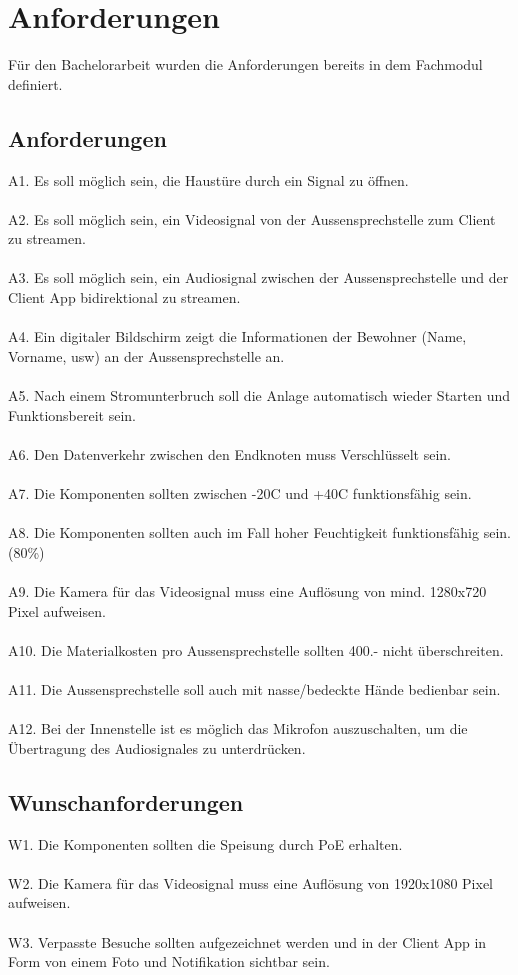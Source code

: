 \section{Anforderungen}
Für den Bachelorarbeit wurden die Anforderungen bereits in dem Fachmodul definiert.
\subsection{Anforderungen}
\label{sec:anforderungen}
A1. Es soll möglich sein, die Haustüre durch ein Signal zu öffnen. 
\\
\\
A2. Es soll möglich sein, ein Videosignal von der Aussensprechstelle zum Client zu streamen. 
\\
\\
A3. Es soll möglich sein, ein Audiosignal zwischen der Aussensprechstelle und der Client App bidirektional zu streamen. 
\\
\\
A4. Ein digitaler Bildschirm zeigt die Informationen der Bewohner (Name, Vorname, usw) an der Aussensprechstelle an. 
\\
\\
A5. Nach einem Stromunterbruch soll die Anlage automatisch wieder Starten und Funktionsbereit sein. 
\\
\\
A6. Den Datenverkehr zwischen den Endknoten muss Verschlüsselt sein. 
\\
\\
A7. Die Komponenten sollten zwischen -20C und +40C funktionsfähig sein. 
\\
\\
A8. Die Komponenten sollten auch im Fall hoher Feuchtigkeit funktionsfähig sein. (80\%) 
\\
\\
A9. Die Kamera für das Videosignal muss eine Auflösung von mind. 1280x720 Pixel aufweisen.  
\\
\\
A10. Die Materialkosten pro Aussensprechstelle sollten 400.- nicht überschreiten. 
\\
\\
A11. Die Aussensprechstelle soll auch mit nasse/bedeckte Hände bedienbar sein. 
\\
\\
A12. Bei der Innenstelle ist es möglich das Mikrofon auszuschalten, um die Übertragung des Audiosignales zu unterdrücken. 

\subsection{Wunschanforderungen}
W1. Die Komponenten sollten die Speisung durch PoE erhalten. 
\\
\\
W2. Die Kamera für das Videosignal muss eine Auflösung von 1920x1080 Pixel aufweisen. 
\\
\\
W3. Verpasste Besuche sollten aufgezeichnet werden und in der Client App in Form von einem Foto und Notifikation sichtbar sein.
\newpage

